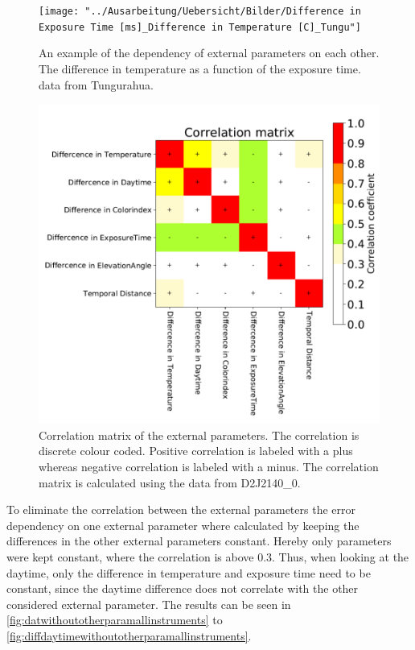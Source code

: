 \documentclass  [
  paper    = a4,
  BCOR     = 10mm,
  twoside,
  fontsize = 12pt,
  fleqn,
  toc      = bibnumbered,
  toc      = listofnumbered,
  numbers  = noendperiod,
  headings = normal,
  listof   = leveldown,
  version  = 3.03
]                                       {scrreprt}
\begin{document}
	\begin{figure}[h]
		\centering
		\texttt{[image: "../Ausarbeitung/Uebersicht/Bilder/Difference in Exposure Time [ms]\_Difference in Temperature [C]\_Tungu"]}
		\caption{An example of the dependency of external parameters on each other. The difference in temperature as a function of the exposure time. data from Tungurahua.}
		\label{fig:difference-in-exposure-time-msdifference-in-temperature-ctungu}
	\end{figure}
	\begin{figure}[h]
		\centering
		\includegraphics[width=1\linewidth]{Bilder/varCorrelation_matrix}
		\caption{Correlation matrix of the external parameters. The correlation is discrete colour coded. Positive correlation is labeled with a plus whereas negative correlation is labeled with a minus. The correlation matrix is calculated using the data from D2J2140\_0.}
		\label{fig:varcorrelationmatrix}
	\end{figure}
%
	To eliminate the correlation between the external parameters the   error dependency on one external parameter where calculated by keeping the differences in the other external parameters constant. Hereby only parameters were kept constant, where the correlation is above 0.3. Thus, when looking at the daytime, only the difference in temperature and exposure time need to be constant, since the daytime  difference does not correlate with the other considered external parameter. The results can be seen in \cref{fig:datwithoutotherparamallinstruments} to \cref{fig:diffdaytimewithoutotherparamallinstruments}.\\
\end{document}
